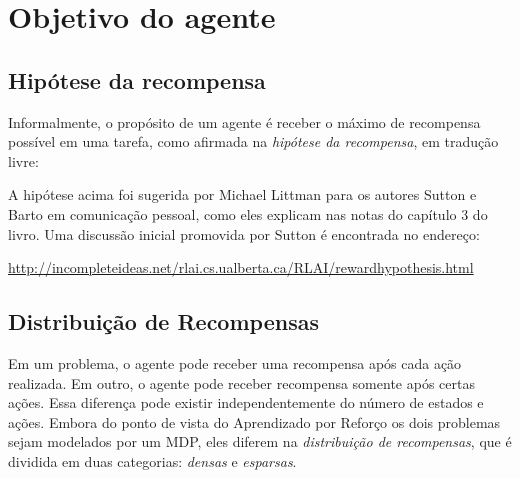\documentclass{article}
\begin{document}
    
    
    \section{Objetivo do agente}
    
        \subsection{Hipótese da recompensa}
    
            Informalmente, o propósito de um agente é receber o máximo de recompensa possível em uma tarefa, como afirmada na \emph{hipótese da recompensa}, em tradução livre:
            \begin{center}
            \noindent{}%
            \end{center}
            
            A hipótese acima foi sugerida por Michael Littman para os autores Sutton e Barto em comunicação pessoal, como eles explicam nas notas do capítulo 3 do livro. Uma discussão inicial promovida por Sutton é encontrada no endereço:
            
            \url{http://incompleteideas.net/rlai.cs.ualberta.ca/RLAI/rewardhypothesis.html}
            
        \subsection{Distribuição de Recompensas}

            Em um problema, o agente pode receber uma recompensa após cada ação realizada. Em outro, o agente pode receber recompensa somente após certas ações. Essa diferença pode existir independentemente do número de estados e ações. Embora do ponto de vista do Aprendizado por Reforço os dois problemas sejam modelados por um MDP, eles diferem na \emph{distribuição de recompensas}, que é dividida em duas categorias: \emph{densas} e \emph{esparsas}.
        
\end{document}
